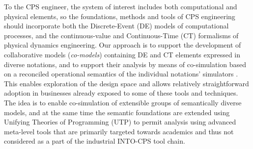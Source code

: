 To the CPS engineer, the system of interest includes both computational and physical elements, so the foundations, methods and tools of CPS engineering should incorporate both the Discrete-Event (DE) models of computational processes, and the continuous-value and Continuous-Time (CT) formalisms of physical dynamics engineering. Our approach is to support the development of collaborative models (\emph{co-models}) containing DE and CT elements expressed in diverse notations, and to support their analysis by means of co-simulation based on a reconciled operational semantics of the individual notations' simulators \cite{Fitzgerald&14c}. This enables exploration of the design space and allows relatively straightforward adoption in businesses already exposed to some of these tools and techniques. The idea is to enable co-simulation of extensible groups of semantically diverse models, and at the same time the semantic foundations are extended using Unifying Theories of Programming (UTP) to permit analysis using advanced meta-level tools that are primarily targeted towards academics and thus not considered as a part of the industrial INTO-CPS tool chain.

